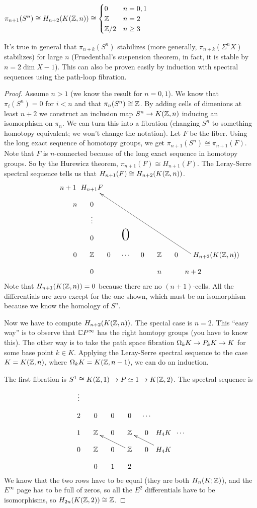 \begin{theorem}[Serre]
 $\pi_{n+1}(S^n)\cong H_{n+2}(K(\mathbb{Z},n))\cong
 \begin{cases}
  0 & n=0,1\\
  \mathbb{Z} & n=2\\
  \mathbb{Z}/2 & n\ge 3
 \end{cases}$
\end{theorem}
It's true in general that $\pi_{n+k}(S^n)$ stabilizes (more generally, $\pi_{n+k}(\Sigma^n X)$ stabilizes) for large $n$ (Fruedenthal's suspension theorem, in fact, it is stable by $n=2\dim X -1$). This can also be proven easily by induction with spectral sequences using the path-loop fibration.
\begin{proof}
 Assume $n>1$ (we know the result for $n=0,1$). We know that $\pi_i(S^n)=0$ for $i<n$ and that $\pi_n(S^n)\cong \mathbb{Z}$. By adding cells of dimenions at least $n+2$ we construct an inclusion map $S^n\to K(\mathbb{Z},n)$ inducing an isomorphism on $\pi_n$. We can turn this into a fibration (changing $S^n$ to something homotopy equivalent; we won't change the notation). Let $F$ be the fiber. Using the long exact sequence of homotopy groups, we get $\pi_{n+1}(S^n)\cong \pi_{n+1}(F)$. Note that $F$ is $n$-connected because of the long exact sequence in homotopy groups. So by the Hurewicz theorem, $\pi_{n+1}(F)\cong H_{n+1}(F)$. The Leray-Serre spectral sequence tells us that $H_{n+1}(F)\cong H_{n+2}(K(\mathbb{Z},n))$.
 \[\xymatrix@!0 @R+0pc @C+0pc{
 n+1\qquad & H_{n+1}F\\
 n  & 0\\
 & \vdots \\
 & 0 & & \smash{\mbox{\Huge 0}}\\ 
 0 & \ZZ & 0 & \cdots & 0 & \ZZ & 0 & \rlap{$H_{n+2}(K(\ZZ,n))$}\ar[lllllluuuu]\\
 & 0 & & & & n & & n+2
 }\]
 Note that $H_{n+1}(K(\mathbb{Z},n))=0$ because there are no $(n+1)$-cells. All the differentials are zero except for the one shown, which must be an isomorphism because we know the homology of $S^n$.

 Now we have to compute $H_{n+2}(K(\mathbb{Z},n))$. The special case is $n=2$. This ``easy way'' is to observe that $\mathbb{C} P^\infty$ has the right homtopy groups (you have to know this). The other way is to take the path space fibration $\Omega_k K\to P_k K\to K$ for some base point $k\in K$. Applying the Leray-Serre spectral sequence to the case $K=K(\mathbb{Z},n)$, where $\Omega_k K=K(\mathbb{Z},n-1)$, we can do an induction.
 
 The first fibration is $S^1\cong K(\mathbb{Z},1)\to P\simeq 1\to K(\mathbb{Z},2)$. The spectral sequence is
 \[\xymatrix @!0{
  \vdots\\
  2& 0 & 0 & 0 & \cdots\\
  1& \ZZ & 0 & \ZZ & 0 & H_4K & \cdots\\
  0& \ZZ & 0 & \ZZ\ar[ull] & 0 & H_4K\ar[ull]\\
  & 0 & 1 & 2 
 }\]
 We know that the two rows have to be equal (they are both $H_n(K;\mathbb{Z})$), and the $E^\infty$ page has to be full of zeros, so all the $E^2$ differentials have to be isomorphisms, so $H_{2n}(K(\mathbb{Z},2))\cong \mathbb{Z}$.


\end{proof}
